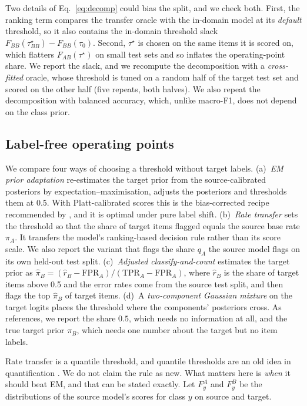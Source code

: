 Two details of Eq.~\eqref{eq:decomp} could bias the split, and we check both. First, the ranking term compares the transfer oracle with the in-domain model at its \emph{default} threshold, so it also contains the in-domain threshold slack $F_{BB}(\tau^\star_{BB})-F_{BB}(\tau_0)$. Second, $\tau^\star$ is chosen on the same items it is scored on, which flatters $F_{AB}(\tau^\star)$ on small test sets and so inflates the operating-point share. We report the slack, and we recompute the decomposition with a \emph{cross-fitted} oracle, whose threshold is tuned on a random half of the target test set and scored on the other half (five repeats, both halves). We also repeat the decomposition with balanced accuracy, which, unlike macro-F1, does not depend on the class prior.

\subsection{Label-free operating points}\label{sec:oprepair}
We compare four ways of choosing a threshold without target labels.
(a)~\emph{EM prior adaptation} \citep{saerens2002adjusting} re-estimates the target prior from the source-calibrated posteriors by expectation--maximisation, adjusts the posteriors and thresholds them at 0.5. With Platt-calibrated scores this is the bias-corrected recipe recommended by \citet{alexandari2020labelshift}, and it is optimal under pure label shift.
(b)~\emph{Rate transfer} sets the threshold so that the share of target items flagged equals the source base rate $\pi_A$. It transfers the model's ranking-based decision rule rather than its score scale. We also report the variant that flags the share $q_A$ the source model flags on its own held-out test split.
(c)~\emph{Adjusted classify-and-count} \citep{forman2008quantifying} estimates the target prior as $\hat\pi_B=(\hat r_B-\mathrm{FPR}_A)/(\mathrm{TPR}_A-\mathrm{FPR}_A)$, where $\hat r_B$ is the share of target items above 0.5 and the error rates come from the source test split, and then flags the top $\hat\pi_B$ of target items.
(d)~A \emph{two-component Gaussian mixture} on the target logits places the threshold where the components' posteriors cross.
As references, we report the share $0.5$, which needs no information at all, and the true target prior $\pi_B$, which needs one number about the target but no item labels.

Rate transfer is a quantile threshold, and quantile thresholds are an old idea in quantification \citep{forman2008quantifying}. We do not claim the rule as new. What matters here is \emph{when} it should beat EM, and that can be stated exactly. Let $F^A_y$ and $F^B_y$ be the distributions of the source model's scores for class $y$ on source and target.

